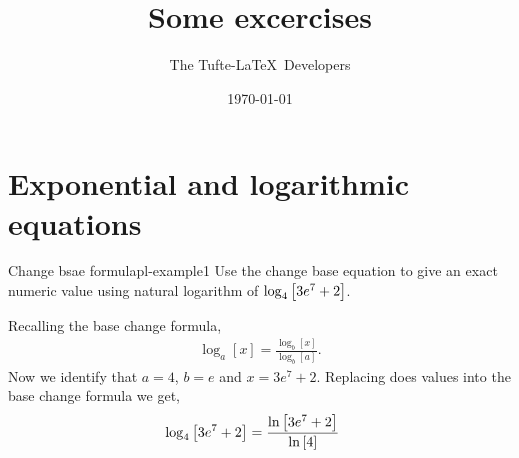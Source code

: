 \documentclass{tufte-handout}
\title{Some excercises}
\author[The Tufte-LaTeX Developers]{The Tufte-\LaTeX\ Developers}
\date{\today}  %
\begin{document}
\section{Exponential and logarithmic equations}

\begin{prob}{Change bsae formula}{pl-example1}
    Use the change base equation to give an exact numeric value using natural logarithm of $\log_{4}\qty[3e^7+2]$.
    
    Recalling the base change formula,
    \begin{gather}
        \log_a[x] = \frac{\log_b[x]}{\log_b[a]}.
    \end{gather}
    Now we identify that $a=4$, $b=e$ and $x=3e^7+2$.
    Replacing does values into the base change formula we get,
    \begin{align*}
        \log_{4}\qty[3e^7+2] &= \frac{\ln\left[3e^7+2\right]}{\ln\left[4\right]}
    \end{align*}


\end{prob}
\end{document}
